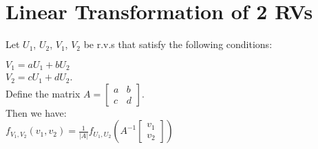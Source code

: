 \section{Linear Transformation of 2 RVs}
    Let $U_1$, $U_2$, $V_1$, $V_2$ be r.v.s
    that satisfy the following conditions:

    $V_1=aU_1+bU_2$\\
    $V_2=cU_1+dU_2$.\\
    Define the matrix $A=\begin{bmatrix}a&b\\c&d\end{bmatrix}$.\\
    Then we have:\\
    $f_{V_1,V_2}(v_1,v_2)=\frac{1}{|A|}f_{U_1,U_2}(A^{-1}\begin{bmatrix}v_1\\v_2\end{bmatrix})$\\
